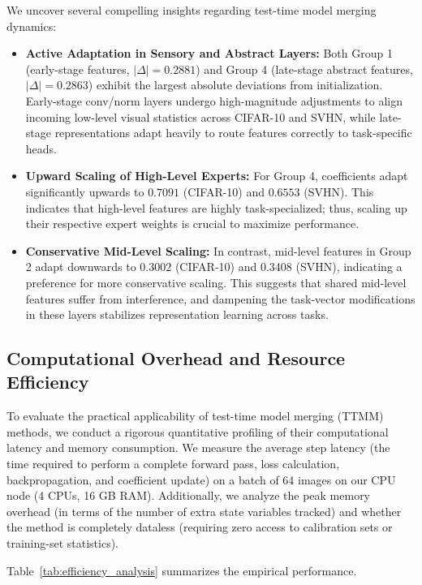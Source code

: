 \documentclass{article}
\theoremstyle{plain}
\theoremstyle{definition}
\theoremstyle{remark}
\begin{document}
We uncover several compelling insights regarding test-time model merging dynamics:
\begin{itemize}
    \item \textbf{Active Adaptation in Sensory and Abstract Layers:} Both Group 1 (early-stage features, $|\Delta| = 0.2881$) and Group 4 (late-stage abstract features, $|\Delta| = 0.2863$) exhibit the largest absolute deviations from initialization. Early-stage conv/norm layers undergo high-magnitude adjustments to align incoming low-level visual statistics across CIFAR-10 and SVHN, while late-stage representations adapt heavily to route features correctly to task-specific heads.
    \item \textbf{Upward Scaling of High-Level Experts:} For Group 4, coefficients adapt significantly upwards to $0.7091$ (CIFAR-10) and $0.6553$ (SVHN). This indicates that high-level features are highly task-specialized; thus, scaling up their respective expert weights is crucial to maximize performance.
    \item \textbf{Conservative Mid-Level Scaling:} In contrast, mid-level features in Group 2 adapt downwards to $0.3002$ (CIFAR-10) and $0.3408$ (SVHN), indicating a preference for more conservative scaling. This suggests that shared mid-level features suffer from interference, and dampening the task-vector modifications in these layers stabilizes representation learning across tasks.
\end{itemize}

\subsection{Computational Overhead and Resource Efficiency}
To evaluate the practical applicability of test-time model merging (TTMM) methods, we conduct a rigorous quantitative profiling of their computational latency and memory consumption. We measure the average step latency (the time required to perform a complete forward pass, loss calculation, backpropagation, and coefficient update) on a batch of 64 images on our CPU node (4 CPUs, 16 GB RAM). Additionally, we analyze the peak memory overhead (in terms of the number of extra state variables tracked) and whether the method is completely dataless (requiring zero access to calibration sets or training-set statistics).

Table~\ref{tab:efficiency_analysis} summarizes the empirical performance.
\end{document}
